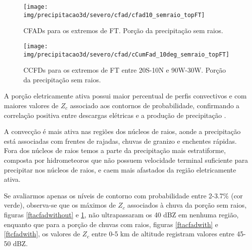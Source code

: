 \begin{figure}[!ht]
  \centering
  \texttt{[image: img/precipitacao3d/severo/cfad/cfad10\_semraio\_topFT]}
 \caption{CFADs para os extremos de FT. Porção da precipitação sem raios.}
 \label{ftcfadwithout}
\end{figure} 

\begin{figure}[!ht]
  \centering
   {\texttt{[image: img/precipitacao3d/severo/cfad/cCumFad\_10deg\_semraio\_topFT]}}
 \caption{CCFDs para os extremos de FT entre 20S-10N e 90W-30W. Porção da precipitação sem raios.}
 \label{ftccfadwithout}
\end{figure} 







A porção eletricamente ativa possui maior percentual de perfis convectivos e com maiores valores de $Z_c$ associado aos contornos de probabilidade, confirmando a correlação positiva entre descargas elétricas e a produção de precipitação \cite{Petersen1998}.

A convecção é mais ativa nas regiões dos núcleos de raios, aonde a precipitação está associadas com frentes de rajadas, chuvas de granizo e enchentes rápidas. Fora dos núcleos de raios temos a parte da precipitação mais estratiforme, composta por hidrometeoros que não possuem velocidade terminal suficiente para precipitar nos núcleos de raios, e caem mais afastados da região eletricamente ativa.     %



Se avaliarmos apenas os níveis de contorno com probabilidade entre 2-3.7\% (cor verde), observa-se que os máximos de $Z_c$ associados à chuva da porção sem raios, figuras \ref{ftacfadwithout} e \ref{ftcfadwithout}, não ultrapassaram os 40 dBZ em nenhuma região, enquanto que para a porção de chuvas com raios, figuras \ref{ftacfadwith} e \ref{ftcfadwith}, os valores de $Z_c$ entre 0-5 km de altitude registram valores entre 45-50 dBZ.


